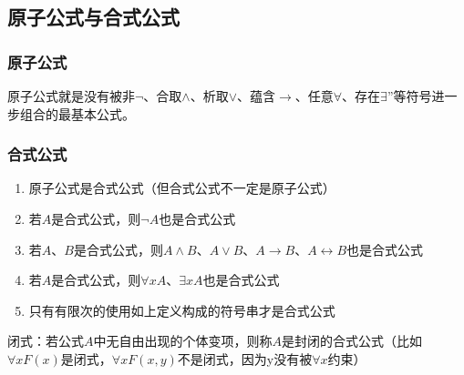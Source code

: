 \documentclass{ctexart}
\numberwithin{figure}{section}
\numberwithin{equation}{section}
\numberwithin{table}{section}
\begin{document}
    \subsection{原子公式与合式公式}
        \subsubsection{原子公式}
        原子公式就是没有被非$\neg$、合取$\wedge$、析取$\vee$、蕴含$\rightarrow$、任意$\forall$、存在$\exists$”等符号进一步组合的最基本公式。
        \subsubsection{合式公式}
        \begin{enumerate}
            \item 原子公式是合式公式（但合式公式不一定是原子公式）
            \item 若$A$是合式公式，则$\neg A$也是合式公式
            \item 若$A$、$B$是合式公式，则$A\wedge B$、$A \vee B$、$A\rightarrow B$、$A\leftrightarrow B$也是合式公式
            \item 若$A$是合式公式，则$\forall xA$、$\exists xA$也是合式公式
            \item 只有有限次的使用如上定义构成的符号串才是合式公式
        \end{enumerate}
        
        闭式：若公式$A$中无自由出现的个体变项，则称$A$是封闭的合式公式（比如$\forall xF(x)$是闭式，$\forall xF(x,y)$不是闭式，因为y没有被$\forall x$约束）
\end{document}
